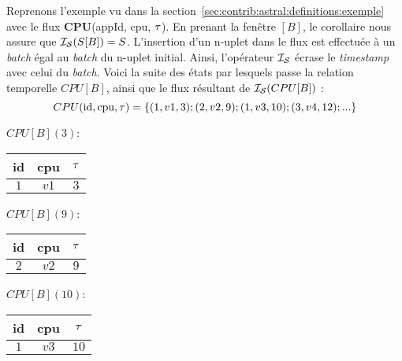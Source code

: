 \begin{example}
Reprenons l'exemple vu dans la section~\ref{sec:contrib:astral:definitions:exemple} avec le flux \textbf{CPU}(appId, cpu, $\tau$). En prenant la fenêtre $[B]$, le corollaire nous assure que $\mathcal{I_S}(S[B])=S$. L'insertion d'un n-uplet dans le flux est effectuée à un \textit{batch} égal au \textit{batch} du n-uplet initial. Ainsi, l'opérateur $\mathcal{I_S}$ écrase le \textit{timestamp} avec celui du \textit{batch}. Voici la suite des états par lesquels passe la relation temporelle $CPU[B]$, ainsi que le flux résultant de $\mathcal{I_S}(CPU[B])$ :
$$CPU(\textrm{id},\textrm{cpu},\tau)=\{(1,v1,3);(2,v2,9);(1,v3,10);(3,v4,12);...\}$$
\noindent\begin{minipage}[c]{0.24\linewidth}
\begin{center}$CPU[B](3)$: \\ \vspace{1em}
\begin{tabular}{|c|c|c|}
\hline
id & cpu & $\tau$ \\
\hline
$1$ & $v1$ & $3$ \\
\hline
\end{tabular}\end{center}
\end{minipage} %
\begin{minipage}[c]{0.24\linewidth}
\begin{center}$CPU[B](9)$: \\ \vspace{1em}
\begin{tabular}{|c|c|c|}
\hline
id & cpu & $\tau$ \\
\hline
$2$ & $v2$ & $9$ \\
\hline
\end{tabular}\end{center}
\end{minipage} %
\begin{minipage}[c]{0.24\linewidth}
\begin{center}$CPU[B](10)$: \\ \vspace{1em}
\begin{tabular}{|c|c|c|}
\hline
id & cpu & $\tau$ \\
\hline
$1$ & $v3$ & $10$ \\
\hline
\end{tabular}\end{center}
\end{minipage} %
\begin{minipage}[c]{0.24\linewidth}

\end{minipage}
\end{example}

